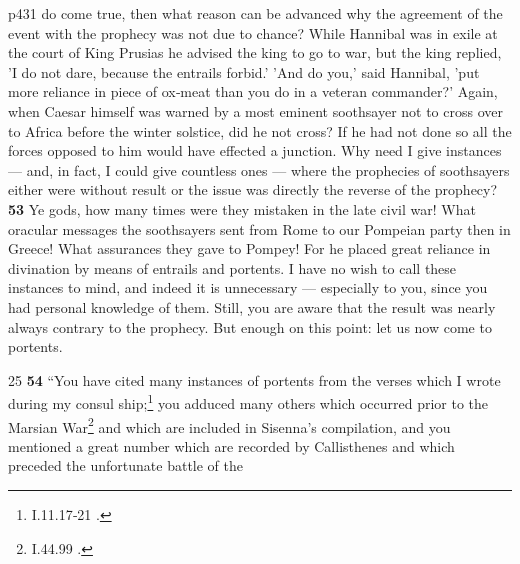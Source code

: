 p431 do come true, then what reason can be advanced why the agreement of the event with the prophecy was not due to chance? While Hannibal was in exile at the court of King Prusias he advised the king to go to war, but the king replied, 'I do not dare, because the entrails forbid.' 'And do you,' said Hannibal, 'put more reliance in piece of ox\texthebrew{‑}meat than you do in a veteran commander?' Again, when Caesar himself was warned by a most eminent soothsayer not to cross over to Africa before the winter solstice, did he not cross? If he had not done so all the forces opposed to him would have effected a junction. Why need I give instances \texthebrew{—} and, in fact, I could give countless ones \texthebrew{—} where the prophecies of soothsayers either were without result or the issue was directly the reverse of the prophecy? \textbf{53} Ye gods, how many times were they mistaken in the late civil war! What oracular messages the soothsayers sent from Rome to our Pompeian party then in Greece! What assurances they gave to Pompey! For he placed great reliance in divination by means of entrails and portents. I have no wish to call these instances to mind, and indeed it is unnecessary \texthebrew{—} especially to you, since you had personal knowledge of them. Still, you are aware that the result was nearly always contrary to the prophecy. But enough on this point: let us now come to portents.

25
\textbf{54} ``You have cited many instances of portents from the verses which I wrote during my consul ­ship;\texthebrew{}\footnote{I.11.17\texthebrew{‑}21 .

} you adduced many others which occurred prior to the Marsian War\texthebrew{}\footnote{I.44.99 .

} and which are included in Sisenna's compilation, and you mentioned a great number which are recorded by Callisthenes and which preceded the unfortunate battle of the

